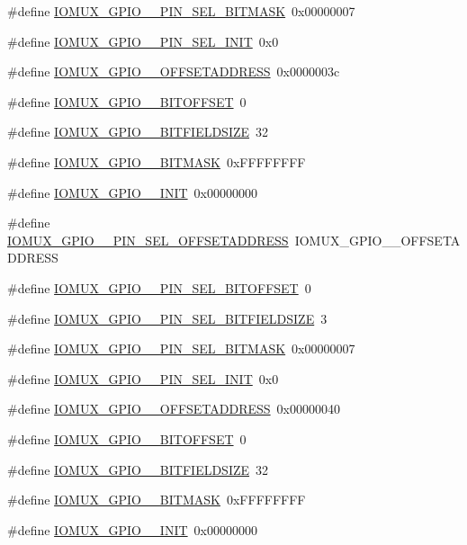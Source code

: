 \begin{DoxyCompactItemize}
\item 
\#define \hyperlink{a00560_a4cd8d2fd7282f4ef96457c60e4f96896}{IOMUX\_\-GPIO\_\_\-PIN\_\-SEL\_\-BITMASK}~0x00000007
\item 
\#define \hyperlink{a00560_a28f4f828b64de1a661f26751ef483f4a}{IOMUX\_\-GPIO\_\_\-PIN\_\-SEL\_\-INIT}~0x0
\item 
\#define \hyperlink{a00560_aaa314cace122859bc147dd0e865c4b1c}{IOMUX\_\-GPIO\_\_\-OFFSETADDRESS}~0x0000003c
\item 
\#define \hyperlink{a00560_ae70ff7f60cb6f4c66d01b7155da9c210}{IOMUX\_\-GPIO\_\_\-BITOFFSET}~0
\item 
\#define \hyperlink{a00560_a6cded317c7410b400089fc6f77d91d34}{IOMUX\_\-GPIO\_\_\-BITFIELDSIZE}~32
\item 
\#define \hyperlink{a00560_ab91ea977b551f339e107a55a56a696d4}{IOMUX\_\-GPIO\_\_\-BITMASK}~0xFFFFFFFF
\item 
\#define \hyperlink{a00560_a6cfcfd00d8b8e9979bebb853555d489c}{IOMUX\_\-GPIO\_\_\-INIT}~0x00000000
\item 
\#define \hyperlink{a00560_aa529b639b62b2f47310e0cadb1a640d9}{IOMUX\_\-GPIO\_\_\-PIN\_\-SEL\_\-OFFSETADDRESS}~IOMUX\_\-GPIO\_\_\-OFFSETADDRESS
\item 
\#define \hyperlink{a00560_a67f8faed9fd7187a9ee4af9be7c846a9}{IOMUX\_\-GPIO\_\_\-PIN\_\-SEL\_\-BITOFFSET}~0
\item 
\#define \hyperlink{a00560_a29a9ae7af91d42d096af6eeee0125431}{IOMUX\_\-GPIO\_\_\-PIN\_\-SEL\_\-BITFIELDSIZE}~3
\item 
\#define \hyperlink{a00560_a073d11bc0b8c926be3fc5e31ee36a318}{IOMUX\_\-GPIO\_\_\-PIN\_\-SEL\_\-BITMASK}~0x00000007
\item 
\#define \hyperlink{a00560_adc2a155150befa8314cdd7006653ed3b}{IOMUX\_\-GPIO\_\_\-PIN\_\-SEL\_\-INIT}~0x0
\item 
\#define \hyperlink{a00560_a8b195168ec7b9e21da0bd399a0b74b0a}{IOMUX\_\-GPIO\_\_\-OFFSETADDRESS}~0x00000040
\item 
\#define \hyperlink{a00560_a8b459ca6ff0b7a1e9dcaa6e9d3290420}{IOMUX\_\-GPIO\_\_\-BITOFFSET}~0
\item 
\#define \hyperlink{a00560_a63f8d54ea0d1ccf70d70e2cf27a72f66}{IOMUX\_\-GPIO\_\_\-BITFIELDSIZE}~32
\item 
\#define \hyperlink{a00560_afcf5da6659795ebc0b513f2a3c6b9481}{IOMUX\_\-GPIO\_\_\-BITMASK}~0xFFFFFFFF
\item 
\#define \hyperlink{a00560_ac80d59a2045bdc13a4ffd34c7020e59d}{IOMUX\_\-GPIO\_\_\-INIT}~0x00000000

\end{DoxyCompactItemize}
